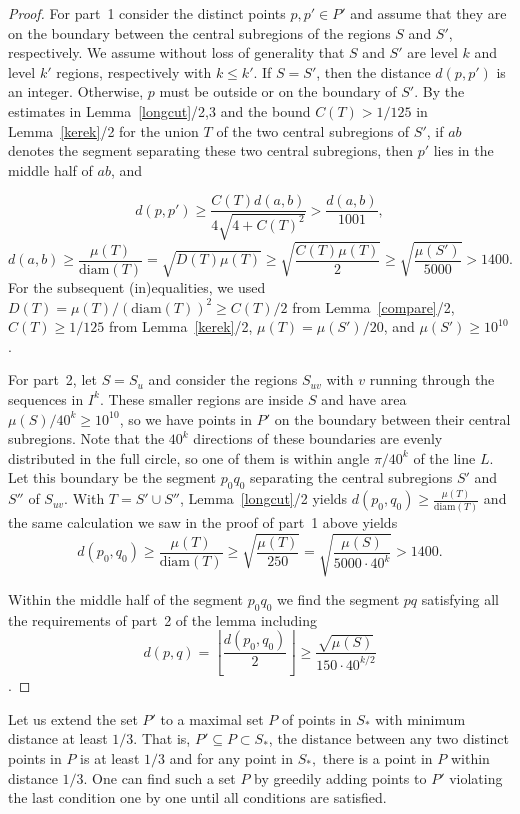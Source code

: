 \documentclass[12pt]{article}
\theoremstyle{plain}
\theoremstyle{definition}
\theoremstyle{remark}
\def\diam{\mathrm{diam}}
\begin{document}
\begin{proof}
For part~1 consider the distinct points $p,p'\in P'$ and assume that they are on the boundary between the central subregions of the regions $S$ and $S'$, respectively. We assume without loss of generality that $S$ and $S'$ are level $k$ and level $k'$ regions, respectively with $k\le k'$. If $S=S'$, then the distance $d(p,p')$ is an integer. Otherwise, $p$ must be outside or on the boundary of $S'$. By the estimates in Lemma~\ref{longcut}/2,3 and the bound $C(T)>1/125$ in Lemma~\ref{kerek}/2 for the union $T$ of the two central subregions of $S'$, if $ab$ denotes the segment separating these two central subregions, then $p'$ lies in the middle half of $ab$, and

$$d(p,p')\ge \frac{C(T)d(a,b)}{4\sqrt{4+C(T)^2}}>\frac{d(a,b)}{1001},$$ $$d(a,b)\ge\frac{\mu(T)}{\diam(T)}=\sqrt{D(T)\mu(T)}\ge\sqrt{\frac{C(T)\mu(T)}2}\ge\sqrt{\frac{\mu(S')}{5000}}>1400.$$
For the subsequent (in)equalities, we used $D(T)=\mu(T)/(\diam(T))^2\ge C(T)/2$ from Lemma~\ref{compare}/2, $C(T)\ge1/125$ from Lemma~\ref{kerek}/2, $\mu(T)=\mu(S')/20$, and $\mu(S')\ge10^{10}$.

For part~2, let $S=S_u$ and consider the regions $S_{uv}$ with $v$ running through the sequences in $I^k$. These smaller regions are inside $S$ and have area $\mu(S)/40^k\ge10^{10}$, so we have points in $P'$ on the boundary between their central subregions. Note that the $40^k$ directions of these boundaries are evenly distributed in the full circle, so one of them is within angle $\pi/40^k$ of the line $L$. Let this boundary be the segment $p_0q_0$ separating the central subregions $S'$ and $S''$ of $S_{uv}$. With $T=S'\cup S''$, Lemma~\ref{longcut}/2 yields $d(p_0,q_0)\ge\frac{\mu(T)}{\diam(T)}$ and the same calculation we saw in the proof of part~1 above yields
$$d(p_0,q_0)\ge\frac{\mu(T)}{\diam(T)}\ge\sqrt{\frac{\mu(T)}{250}}=\sqrt{\frac{\mu(S)}{5000\cdot40^k}}>1400.$$

Within the middle half of the segment $p_0q_0$ we find the segment $pq$ satisfying all the requirements of part~2 of the lemma including
$$d(p,q)=\left\lfloor\frac{d(p_0,q_0)}2\right\rfloor\ge\frac{\sqrt{\mu(S)}}{150\cdot 40^{k/2}}$$.
\end{proof}

Let us extend the set $P'$ to a maximal set $P$ of points in $S_*$ with minimum distance at least $1/3$. That is, $P'\subseteq P\subset S_*$, the distance between any two distinct points in $P$ is at least $1/3$ and for any point in $S_*,$ there is a point in $P$ within distance $1/3$. One can find such a set $P$ by greedily adding points to $P'$ violating the last condition one by one until all conditions are satisfied.
\end{document}
